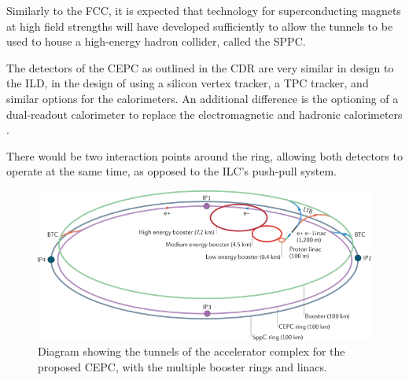 Similarly to the \acrshort{FCC}, it is expected that technology for superconducting magnets at high field strengths will have developed sufficiently to allow the tunnels to be used to house a high-energy hadron collider, called the \acrfull{SPPC}. 

The detectors of the \acrshort{CEPC} as outlined in the \acrshort{CDR} are very similar in design to the \acrshort{ILD}, in the design of using a silicon vertex tracker, a \acrshort{TPC} tracker, and similar options for the calorimeters. An additional difference is the optioning of a dual-readout calorimeter to replace the electromagnetic and hadronic calorimeters \cite{cepc-cdr-physicsanddetector}.

There would be two interaction points around the ring, allowing both detectors to operate at the same time, as opposed to the \acrshort{ILC}'s push-pull system.

\begin{figure}[h]
	\centering
	\includegraphics[width=1.0\textwidth]{../Pictures/CEPC-Scale.png}
	\caption{Diagram showing the tunnels of the accelerator complex for the proposed \acrlong{CEPC}, with the multiple booster rings and linacs.}
	\label{figure:colliders/CEPC/main}
\end{figure}

